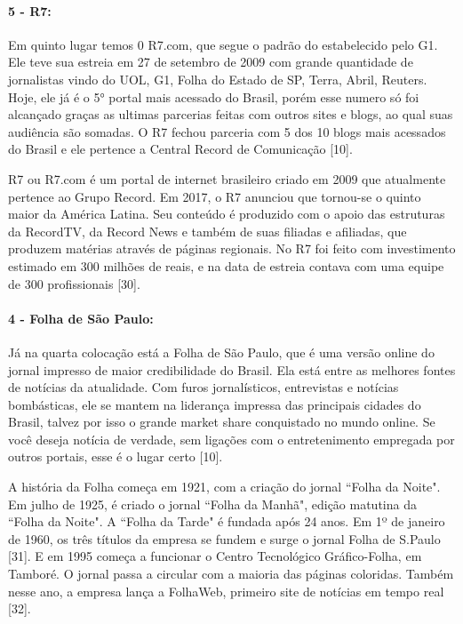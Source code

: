 \documentclass[a4paper]{article}
\begin{document}
\begin{titlepage}
\paragraph{5 - R7: }

Em quinto lugar temos 0 R7.com, que segue o padrão do estabelecido pelo G1. Ele teve sua estreia em 27 de setembro de 2009 com grande quantidade de jornalistas vindo do UOL, G1, Folha do Estado de SP, Terra, Abril, Reuters. Hoje, ele já é o 5° portal mais acessado do Brasil, porém esse numero só foi alcançado graças as ultimas parcerias feitas com outros sites e blogs, ao qual suas audiência são somadas. O R7 fechou parceria com 5 dos 10 blogs mais acessados do Brasil e ele pertence a Central Record de Comunicação [10].

R7 ou R7.com é um portal de internet brasileiro criado em 2009 que atualmente pertence ao Grupo Record. Em 2017, o R7 anunciou que tornou-se o quinto maior da América Latina. Seu conteúdo é produzido com o apoio das estruturas da RecordTV, da Record News e também de suas filiadas e afiliadas, que produzem matérias através de páginas regionais. No R7 foi feito com investimento estimado em 300 milhões de reais, e na data de estreia contava com uma equipe de 300 profissionais [30].

\paragraph{4 - Folha de São Paulo: }

Já na quarta colocação está a Folha de São Paulo, que é uma versão online do jornal impresso de maior credibilidade do Brasil. Ela está entre as melhores fontes de notícias da atualidade. Com furos jornalísticos, entrevistas e notícias bombásticas, ele se mantem na liderança impressa das principais cidades do Brasil, talvez por isso o grande market share conquistado no mundo online. Se você deseja notícia de verdade, sem ligações com o entretenimento empregada por outros portais, esse é o lugar certo [10].

A história da Folha começa em 1921, com a criação do jornal ``Folha da Noite". Em julho de 1925, é criado o jornal ``Folha da Manhã", edição matutina da ``Folha da Noite". A ``Folha da Tarde" é fundada após 24 anos. Em 1º de janeiro de 1960, os três títulos da empresa se fundem e surge o jornal Folha de S.Paulo [31]. E em 1995 começa a funcionar o Centro Tecnológico Gráfico-Folha, em Tamboré. O jornal passa a circular com a maioria das páginas coloridas. Também nesse ano, a empresa lança a FolhaWeb, primeiro site de notícias em tempo real [32].


\end{titlepage}
\end{document}
